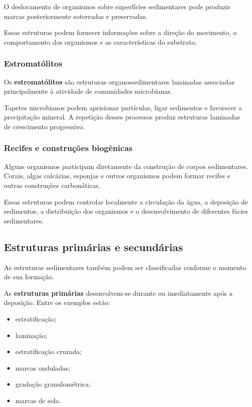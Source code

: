 \documentclass[a4paper,12pt]{article}
\theoremstyle{definition}
\theoremstyle{definition}
\theoremstyle{definition}
\begin{document}
O deslocamento de organismos sobre superfícies sedimentares pode produzir marcas
posteriormente soterradas e preservadas.

Essas estruturas podem fornecer informações sobre a direção do movimento, o
comportamento dos organismos e as características do substrato.

\subsubsection{Estromatólitos}

Os \textbf{estromatólitos} são estruturas organossedimentares laminadas
associadas principalmente à atividade de comunidades microbianas.

Tapetes microbianos podem aprisionar partículas, ligar sedimentos e favorecer a
precipitação mineral. A repetição desses processos produz estruturas laminadas
de crescimento progressivo.

\subsubsection{Recifes e construções biogênicas}

Alguns organismos participam diretamente da construção de corpos sedimentares.
Corais, algas calcárias, esponjas e outros organismos podem formar recifes e
outras construções carbonáticas.

Essas estruturas podem controlar localmente a circulação da água, a deposição de
sedimentos, a distribuição dos organismos e o desenvolvimento de diferentes
fácies sedimentares.

\subsection{Estruturas primárias e secundárias}

As estruturas sedimentares também podem ser classificadas conforme o momento de
sua formação.

As \textbf{estruturas primárias} desenvolvem-se durante ou imediatamente após a
deposição. Entre os exemplos estão:

\begin{itemize}
    \item estratificação;
    \item laminação;
    \item estratificação cruzada;
    \item marcas onduladas;
    \item gradação granulométrica;
    \item marcas de sola.
\end{itemize}
\end{document}

